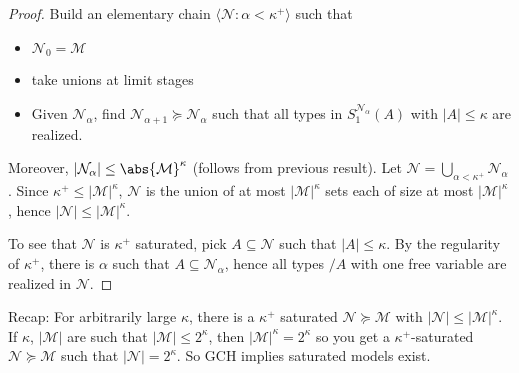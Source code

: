 \documentclass{article}
\newcommand{\M}{\mathcal{M}}
\renewcommand{\N}{\mathcal{N}}
\begin{document}
\begin{proof}
  Build an elementary chain $\langle \N : \alpha < \kappa^+ \rangle$ such that
  \begin{itemize}
    \item $\N_0 = \M$
    \item take unions at limit stages
    \item Given $\N_\alpha$, find $\N_{\alpha + 1} \succcurlyeq \N_\alpha$ such that all types in $S_1^{\N_\alpha}(A)$ with $|A| \leq \kappa$ are realized.
  \end{itemize}
  Moreover, $|\N_\alpha| \leq \abs{\M}^\kappa$ (follows from previous result).
  Let $\N = \bigcup_{\alpha < \kappa^+} \N_\alpha$. Since $\kappa^+ \leq |\mathcal{M}|^\kappa$, $\N$ is the union of at most $|\M|^\kappa$ sets each of size at most $|\M|^\kappa$, hence $|\N| \leq |\M|^\kappa$.

  To see that $\N$ is $\kappa^+$ saturated, pick $A \subseteq \N$ such that $|A| \leq \kappa$.
  By the regularity of $\kappa^+$, there is $\alpha$ such that
  $A \subseteq \N_\alpha$, hence all types $/A$ with one free variable are realized in $\N$.
\end{proof}
Recap: For arbitrarily large $\kappa$, there is a $\kappa^+$ saturated $\N \succcurlyeq \M$ with $|\N| \leq |\M|^\kappa$.
If $\kappa$, $|\M|$ are such that $|\M|\leq 2^\kappa$, then $|\M|^\kappa = 2^\kappa$ so you get a $\kappa^+$-saturated $\N \succcurlyeq \M$ such that $|\N| = 2^\kappa$.
So GCH implies saturated models exist.
\end{document}
